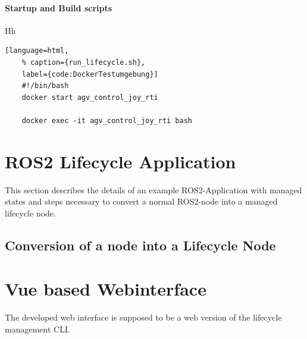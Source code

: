 \paragraph{Startup and Build scripts} Hh


\begin{lstlisting}[language=html,
	% caption={run_lifecycle.sh}, 
	label={code:DockerTestumgebung}]
	#!/bin/bash
	docker start agv_control_joy_rti

	docker exec -it agv_control_joy_rti bash 
\end{lstlisting}

\section{ROS2 Lifecycle Application}
\label{Implementierung:ROS2LifecycleApplication} This section describes the details of an example ROS2-Application with managed states and steps necessary to convert a normal ROS2-node into a managed lifecycle node.     

\subsection{Conversion of a node into a Lifecycle Node}

\section{Vue based Webinterface}
\label{Implementierung:VueBasedWebinterface}
The developed web interface is supposed to be a web version of the lifecycle management CLI. 





